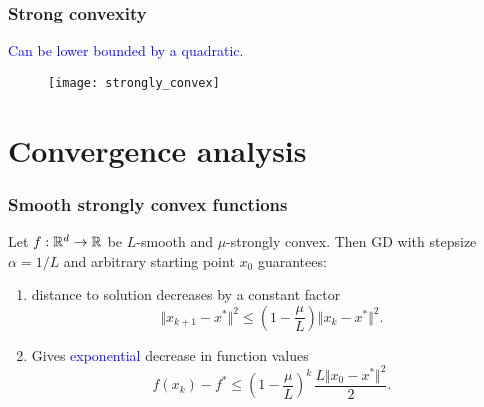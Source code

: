 \documentclass{beamer}
\begin{document}
\begin{frame}
  \frametitle{Strong convexity}
  \begin{center}
    \textcolor{blue}{Can be lower bounded by a quadratic.}
  \end{center}
  \begin{figure}[ht]
    \centering
    \texttt{[image: strongly\_convex]}
  \end{figure}

\end{frame}

\section{Convergence analysis}%
\label{sec:}

\begin{frame}
  \frametitle{Smooth strongly convex functions}

  \begin{theorem}
    Let $f:\mathbb{R}^d \to \mathbb{R}$ be $L$-smooth and $\mu$-strongly convex. Then GD with stepsize $\alpha=1/L$ and arbitrary starting point $x_0$ guarantees:
    \begin{enumerate}
      \item distance to solution decreases by a constant factor
            \begin{equation}
              \Vert x_{k+1}-x^* \Vert^2 \le \left(1-\frac{\mu}{L}\right) \Vert x_k -x^* \Vert^2.
            \end{equation}
      \item Gives \textcolor{blue}{exponential} decrease in function values
            \begin{equation}
              f(x_k)-f^* \le {\left(1-\frac{\mu}{L}\right)}^k \, \frac{L \Vert x_0 -x^* \Vert^2}{2}.
            \end{equation}
    \end{enumerate}
  \end{theorem}

\end{frame}
\end{document}

